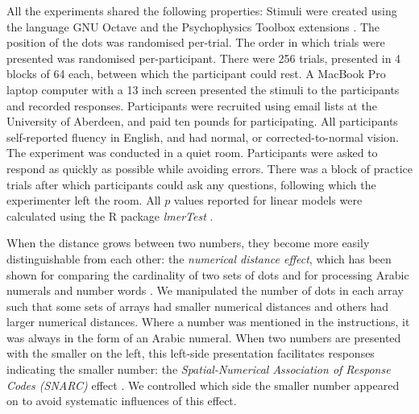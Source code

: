 \documentclass[%
man,		%
floatsintext,%
apacite%
]{apa6}
\begin{document}
All the experiments shared the following properties: 
Stimuli were created using the language GNU Octave \cite{eaton:2002} and the Psychophysics Toolbox extensions \cite{ptbx1, ptbx2}.
The position of the dots was randomised per-trial.
The order in which trials were presented was randomised per-participant. 
There were 256 trials, presented in 4 blocks of 64 each, between which the participant could rest. 
A MacBook Pro laptop computer with a 13 inch screen presented the stimuli to the participants and recorded responses. 
Participants were recruited using email lists at the University of Aberdeen, and paid ten pounds for participating.
All participants self-reported fluency in English, and had normal, or corrected-to-normal vision.
The experiment was conducted in a quiet room. 
Participants were asked to respond as quickly as possible while avoiding errors.
There was a block of practice trials after which participants could ask any questions, following which the experimenter left the room.
All $p$ values reported for linear models were calculated using the R package \emph{lmerTest} \cite{lmerTest}.


When the distance grows between two numbers, they become more easily distinguishable from each other: the \emph{numerical distance effect}, which has been shown for comparing the cardinality of two sets of dots \cite{van123} and for processing Arabic numerals and number words \cite{Dehaene1996}. 
We manipulated the number of dots in each array such that some sets of arrays had smaller numerical distances and others had larger numerical distances. Where a number was mentioned in the instructions, it was always in the form of an Arabic numeral. 
When two numbers are presented with the smaller on the left, this left-side presentation facilitates responses indicating the smaller number: the \emph{Spatial-Numerical Association of Response Codes (SNARC)} effect \cite{dehaene1993mental, gevers2006automatic}. 
We controlled which side the smaller number appeared on to avoid systematic influences of this effect. 
\end{document}
